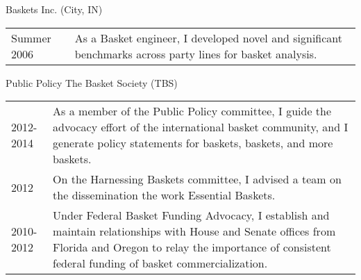 \documentclass[a4paper]{article}
\renewcommand{\section}[2]{\LARGE #1 \hspace{0.95in} \large #2 \normalsize \vspace{0.25in}}
\begin{document}
\vspace{0.5in}

\section{}{\hspace{0.925in} Baskets Inc. \small(City, IN)}

\begin{tabular}[t]{l@{\hspace{1in}} m{}}
	Summer 2006 & As a Basket engineer, I developed novel and significant benchmarks across party lines for basket analysis. 
\end{tabular}

\vspace{0.5in}

\section{Public Policy}{\hspace{-0.5in} The Basket Society \small (TBS)}
\begin{tabular}[t]{l@{\hspace{1.25in}} m{}}
	2012-2014 & As a member of the Public Policy committee, I guide the advocacy effort of the international basket community, and I generate policy statements for baskets, baskets, and more baskets.\\
	2012 & On the Harnessing Baskets committee, I advised a team on the dissemination the work Essential Baskets. \\ 
	2010-2012 & Under Federal Basket Funding Advocacy, I establish and maintain relationships with House and Senate offices from Florida and Oregon to relay the importance of consistent federal funding of basket commercialization.
\end{tabular}

\end{document}
